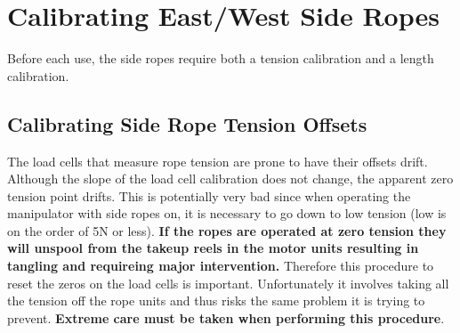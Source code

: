 \documentclass[11pt]{article}
\begin{document}
\section{Calibrating East/West Side Ropes}

Before each use, the side ropes require both a tension calibration and a length calibration.

\subsection{Calibrating Side Rope Tension Offsets}
The load cells that measure rope tension are prone to have their offsets drift. Although the slope of the load cell calibration does not change, the apparent zero tension point drifts. This is potentially very bad since when operating the manipulator with side ropes on, it is necessary to go down to low tension (low is on the order of 5N or less).
{\bf If the ropes are operated at zero tension they will unspool from the takeup reels in the motor units resulting in tangling and requireing major intervention.}
Therefore this procedure to reset the zeros on the load cells is important. Unfortunately it involves taking all the tension off the rope units and thus risks the same problem it is trying to prevent.
{\bf Extreme care must be taken when performing this procedure}.
\end{document}
